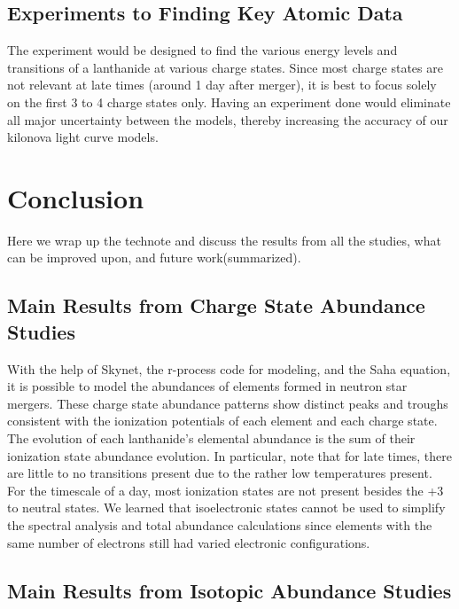 \documentclass[11pt,a4paper]{article}
\begin{document}
\subsection{Experiments to Finding Key Atomic Data}

The experiment would be designed to find the various energy levels and transitions of a lanthanide at various charge states. Since most charge states are not relevant at late times (around 1 day after merger), it is best to focus solely on the first 3 to 4 charge states only. Having an experiment done would eliminate all major uncertainty between the models, thereby increasing the accuracy of our kilonova light curve models.  


\section{Conclusion}

Here we wrap up the technote and discuss the results from all the studies, what can be improved upon, and future work(summarized).  

\subsection{Main Results from Charge State Abundance Studies}

With the help of Skynet, the r-process code for modeling, and the Saha equation, it is possible to model the abundances of elements formed in neutron star mergers. These charge state abundance patterns show distinct peaks and troughs consistent with the ionization potentials of each element and each charge state. 
The evolution of each lanthanide’s elemental abundance is the sum of their ionization state abundance evolution. In particular, note that for late times, there are little to no transitions present due to the rather low temperatures present. For the timescale of a day, most ionization states are not present besides the +3 to neutral states. 
We learned that isoelectronic states cannot be used to simplify the spectral analysis and total abundance calculations since elements with the same number of electrons still had varied electronic configurations. 

\subsection{Main Results from Isotopic Abundance Studies}

\end{document}
